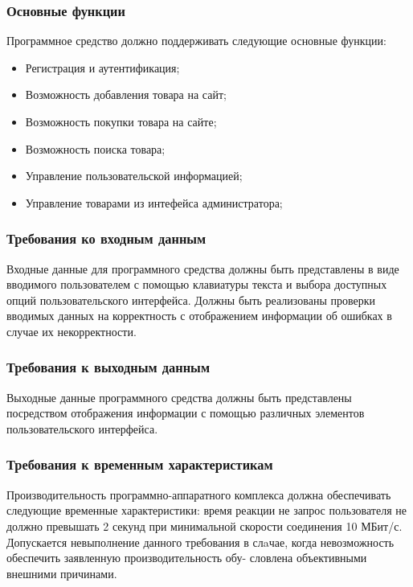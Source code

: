 \subsubsection{Основные функции}\hfill

Программное средство должно поддерживать следующие основные функции:
\begin{itemize}
  \item Регистрация и аутентификация;
  \item Возможность добавления товара на сайт;
  \item Возможность покупки товара на сайте;
  \item Возможность поиска товара;
  \item Управление пользовательской информацией;
  \item Управление товарами из интефейса администратора;
\end{itemize}

\subsubsection{Требования ко входным данным}\hfill

Входные данные для программного средства должны быть представлены в виде вводимого пользователем с помощью клавиатуры текста и выбора доступных опций пользовательского интерфейса.
Должны быть реализованы проверки вводимых данных на корректность с отображением информации об ошибках в случае их некорректности.

\subsubsection{Требования к выходным данным}\hfill

Выходные данные программного средства должны быть представлены посредством отображения информации с помощью различных элементов пользовательского интерфейса.

\subsubsection{Требования к временным характеристикам}\hfill

Производительность программно-аппаратного комплекса должна обеспечивать следующие временные характеристики: время реакции не запрос пользователя не должно превышать 2 секунд при минимальной скорости соединения 10 МБит/с.
Допускается невыполнение данного требования в слaчае, когда невозможность обеспечить заявленную производительность обу- словлена объективными внешними причинами.

